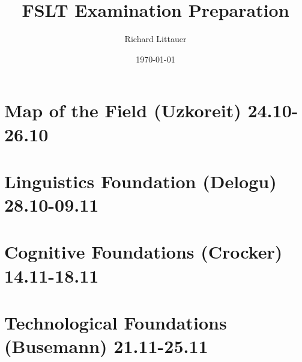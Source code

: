 \documentclass[11pt]{article}
\title{FSLT Examination Preparation}
\author{Richard Littauer}		%
\date{\today}                          		%
\begin{document}
\maketitle


\section{Map of the Field (Uzkoreit) 24.10-26.10}

\section{Linguistics Foundation (Delogu) 28.10-09.11}

\section{ Cognitive Foundations (Crocker) 14.11-18.11}

\section{Technological Foundations (Busemann) 21.11-25.11}
%
%
%
%
%
%
%
%
%
%
%
%
%
%
%
%
%
%
%
%
%
%
%
%
%
%
%
%
%
%
%
%
%
%
%
%
%
%
%
%
%
%
%
%
%
%
%
%
%
%
%
%
%
\end{document}
